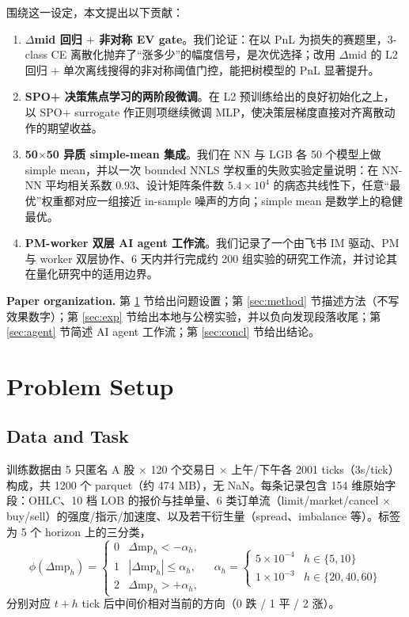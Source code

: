 \documentclass[11pt]{article}
\begin{document}
围绕这一设定，本文提出以下贡献：

\begin{enumerate}
  \item \textbf{$\Delta$mid 回归 $+$ 非对称 EV gate}。我们论证：在以 PnL 为损失的赛题里，3-class CE 离散化抛弃了``涨多少''的幅度信号，是次优选择；改用 $\Delta$mid 的 L2 回归 $+$ 单次离线搜得的非对称阈值门控，能把树模型的 PnL 显著提升。
  \item \textbf{SPO+ 决策焦点学习的两阶段微调}。在 L2 预训练给出的良好初始化之上，以 SPO+ surrogate \cite{spo_plus} 作正则项继续微调 MLP，使决策层梯度直接对齐离散动作的期望收益。
  \item \textbf{50$\times$50 异质 simple-mean 集成}。我们在 NN 与 LGB 各 50 个模型上做 simple mean，并以一次 bounded NNLS 学权重的失败实验定量说明：在 NN-NN 平均相关系数 $0.93$、设计矩阵条件数 $5.4\!\times\!10^{4}$ 的病态共线性下，任意``最优''权重都对应一组接近 in-sample 噪声的方向；simple mean 是数学上的稳健最优。
  \item \textbf{PM-worker 双层 AI agent 工作流}。我们记录了一个由飞书 IM 驱动、PM 与 worker 双层协作、6 天内并行完成约 200 组实验的研究工作流，并讨论其在量化研究中的适用边界。
\end{enumerate}

\noindent\textbf{Paper organization.} 第 \ref{sec:setup} 节给出问题设置；第 \ref{sec:method} 节描述方法（不写效果数字）；第 \ref{sec:exp} 节给出本地与公榜实验，并以负向发现段落收尾；第 \ref{sec:agent} 节简述 AI agent 工作流；第 \ref{sec:concl} 节给出结论。

\section{Problem Setup}
\label{sec:setup}

\subsection{Data and Task}

训练数据由 5 只匿名 A 股 $\times$ 120 个交易日 $\times$ 上午/下午各 2001 ticks（3s/tick）构成，共 1200 个 parquet（约 474 MB），无 NaN。每条记录包含 154 维原始字段：OHLC、10 档 LOB 的报价与挂单量、6 类订单流（limit/market/cancel $\times$ buy/sell）的强度/指示/加速度、以及若干衍生量（spread、imbalance 等）。标签为 5 个 horizon 上的三分类，
\begin{equation}
\phi(\Delta\mathrm{mp}_h) =
\begin{cases}
0 & \Delta\mathrm{mp}_h < -\alpha_h,\\
1 & |\Delta\mathrm{mp}_h| \le \alpha_h,\\
2 & \Delta\mathrm{mp}_h > +\alpha_h,
\end{cases}
\quad
\alpha_h = \begin{cases}5\!\times\!10^{-4} & h\!\in\!\{5,10\}\\ 1\!\times\!10^{-3} & h\!\in\!\{20,40,60\}\end{cases}
\end{equation}
分别对应 $t+h$ tick 后中间价相对当前的方向（0 跌 / 1 平 / 2 涨）。
\end{document}
